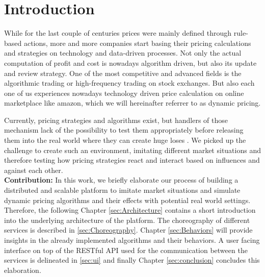 %
\section{Introduction}
%
While for the last couple of centuries prices were mainly defined through rule-based actions, more and more companies start basing their pricing calculations and strategies on technology and data-driven processes. Not only the actual computation of profit and cost is nowadays algorithm driven, but also its update and review strategy.
One of the most competitive and advanced fields is the algorithmic trading or high-frequency trading on stock exchanges. But also each one of us experiences nowadays technology driven price calculation on online marketplace like amazon, which we will hereinafter referrer to as dynamic pricing. 

Currently, pricing strategies and algorithms exist, but handlers of those mechanism lack of the possibility to test them appropriately before releasing them into the real world where they can create huge loses \citep{uflacker2016ertragsmanagement} \citep{schlosser2016optimal} \citep{schlosser2016stochastic} \citep{schlosser2016survive}. We picked up the challenge to create such an environment, imitating different market situations and therefore testing how pricing strategies react and interact based on influences and against each other.\\

\textbf{Contribution:} In this work, we briefly elaborate our process of building a distributed and scalable platform to imitate market situations and simulate dynamic pricing algorithms and their effects with potential real world settings.
Therefore, the following Chapter \ref{sec:Architecture} contains a short introduction into the underlying architecture of the platform.
The choreography of different services is described in \ref{sec:Choreography}. Chapter \ref{sec:Behaviors} will provide insights in the already implemented algorithms and their behaviors.
A user facing interface on top of the RESTful API used for the communication between the services is delineated in \ref{sec:ui} and finally Chapter \ref{sec:conclusion} concludes this elaboration. \\

